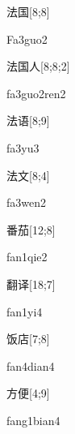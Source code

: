 \begin{verbete}[Fa3guo2]{法国}[8;8]
\begin{pronuncia}{Fa3guo2}
\end{pronuncia}
\end{verbete}

\begin{verbete}{法国人}[8;8;2]
\begin{pronuncia}{fa3guo2ren2}
\end{pronuncia}
\end{verbete}

\begin{verbete}[fa3yu3]{法语}[8;9]
\begin{pronuncia}{fa3yu3}
\end{pronuncia}
\end{verbete}

\begin{verbete}[fa3wen2]{法文}[8;4]
\begin{pronuncia}{fa3wen2}
\end{pronuncia}
\end{verbete}

\begin{verbete}{番茄}[12;8]
\begin{pronuncia}{fan1qie2}
\end{pronuncia}
\end{verbete}

\begin{verbete}[fan1yi4]{翻译}[18;7]
\begin{pronuncia}{fan1yi4}
\end{pronuncia}
\end{verbete}

\begin{verbete}{饭店}[7;8]
\begin{pronuncia}{fan4dian4}
\end{pronuncia}
\end{verbete}

\begin{verbete}{方便}[4;9]
\begin{pronuncia}{fang1bian4}
\end{pronuncia}
\end{verbete}

